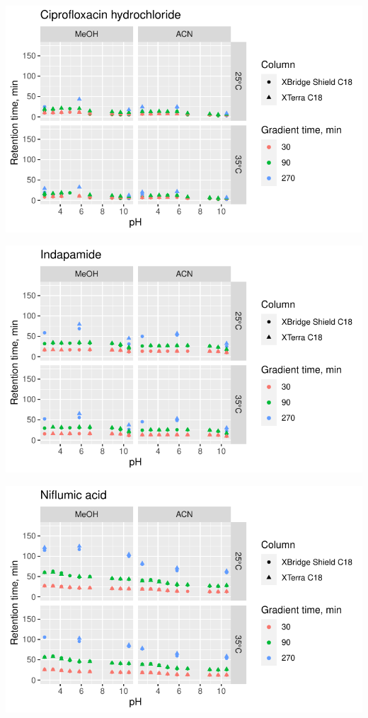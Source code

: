 \documentclass[
  letterpaper,
  DIV=11,
  numbers=noendperiod]{scrreprt}
\begin{document}
\includegraphics{index_files/figure-pdf/unnamed-chunk-4-72.pdf}

\includegraphics{index_files/figure-pdf/unnamed-chunk-4-73.pdf}

\includegraphics{index_files/figure-pdf/unnamed-chunk-4-74.pdf}
\end{document}
